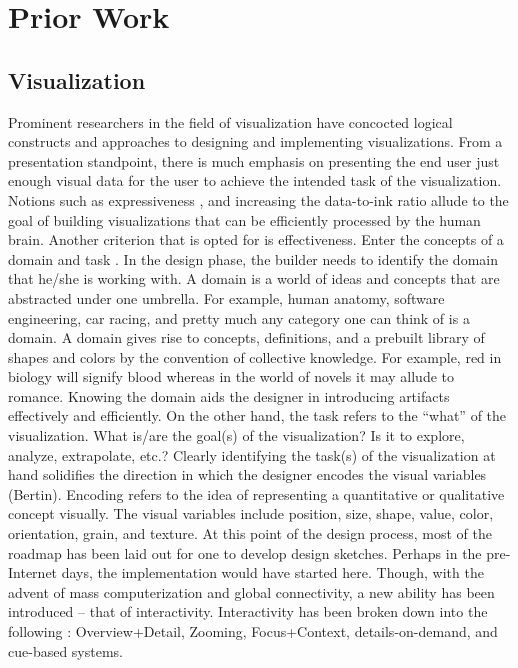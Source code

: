 \documentclass[12pt]{article}
\begin{document}
\section{Prior Work}
\subsection{Visualization}
Prominent researchers in the field of visualization have concocted logical constructs and approaches to designing and implementing visualizations. From a presentation standpoint, there is much emphasis on presenting the end user just enough visual data for the user to achieve the intended task of the visualization. Notions such as expressiveness \cite{schumann}, and increasing the data-to-ink ratio \cite{tufte} allude to the goal of building visualizations that can be efficiently processed by the human brain. Another criterion that is opted for is effectiveness. Enter the concepts of a domain and task \cite{munzner}. In the design phase, the builder needs to identify the domain that he/she is working with. A domain is a world of ideas and concepts that are abstracted under one umbrella. For example, human anatomy, software engineering, car racing, and pretty much any category one can think of is a domain. A domain gives rise to concepts, definitions, and a prebuilt library of shapes and colors by the convention of collective knowledge. For example, red in biology will signify blood whereas in the world of novels it may allude to romance. Knowing the domain aids the designer in introducing artifacts effectively and efficiently. On the other hand, the task refers to the “what” of the visualization. What is/are the goal(s) of the visualization? Is it to explore, analyze, extrapolate, etc.? Clearly identifying the task(s) of the visualization at hand solidifies the direction in which the designer encodes the visual variables (Bertin). Encoding refers to the idea of representing a quantitative or qualitative concept visually. The visual variables include position, size, shape, value, color, orientation, grain, and texture. At this point of the design process, most of the roadmap has been laid out for one to develop design sketches. Perhaps in the pre-Internet days, the implementation would have started here. Though, with the advent of mass computerization and global connectivity, a new ability has been introduced – that of interactivity. Interactivity has been broken down into the following \cite{cockburn}: Overview+Detail, Zooming, Focus+Context, details-on-demand, and cue-based systems.
\end{document}
